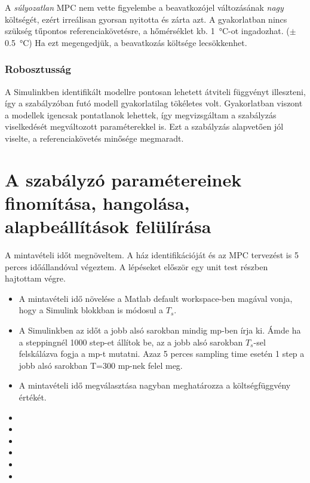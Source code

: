 A \textit{súlyozatlan} MPC nem vette figyelembe a beavatkozójel változásának \textit{nagy} költségét, ezért irreálisan gyorsan nyitotta és zárta azt.
A gyakorlatban nincs szükség tűpontos referenciakövetésre, a hőmérséklet kb. \SI{1}{\celsius}-ot ingadozhat. ($\pm$ \SI{0.5}{\celsius}) Ha ezt megengedjük, a beavatkozás költsége lecsökkenhet.

\subsubsection{Robosztusság}

A Simulinkben identifikált modellre pontosan lehetett átviteli függvényt illeszteni, így a szabályzóban futó modell gyakorlatilag tökéletes volt. Gyakorlatban viszont a modellek igencsak pontatlanok lehettek, így megvizsgáltam a szabályzás viselkedését megváltozott paraméterekkel is. Ezt a szabályzás alapvetően jól viselte, a referenciakövetés minősége megmaradt.

\section{A szabályzó paramétereinek finomítása, hangolása, alapbeállítások felülírása}

A mintavételi időt megnöveltem. A ház identifikációját és az MPC tervezést is 5 perces időállandóval végeztem. A lépéseket először egy unit test részben hajtottam végre.

\begin{itemize}[noitemsep,topsep=-8pt,parsep=0pt,partopsep=0pt]
	\item A mintavételi idő növelése a Matlab default workspace-ben magával vonja, hogy a Simulink blokkban is módosul a $T_s$. 
	\item A Simulinkben az időt a jobb alsó sarokban mindig mp-ben írja ki. Ámde ha a steppingnél 1000 step-et állítok be, az a jobb alsó sarokban $T_s$-sel felskálázva fogja a mp-t mutatni. Azaz 5 perces sampling time esetén 1 step a jobb alsó sarokban T=300 mp-nek felel meg.
	\item A mintavételi idő megválasztása nagyban meghatározza a költségfüggvény értékét.
	\item
	\item
	\item
	\item
	\item
	\item	
\end{itemize}



